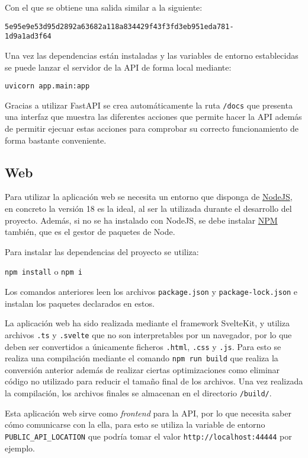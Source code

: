 Con el que se obtiene una salida similar a la siguiente:

\texttt{5e95e9e53d95d2892a63682a118a834429f43f3fd3eb951eda781-}\\
\texttt{1d9a1ad3f64}

Una vez las dependencias están instaladas y las variables de entorno
establecidas se puede lanzar el servidor de la API de forma local mediante:

\texttt{uvicorn app.main:app}

Gracias a utilizar FastAPI se crea automáticamente la ruta \texttt{/docs} que
presenta una interfaz que muestra las diferentes acciones que permite hacer la
API además de permitir ejecuar estas acciones para comprobar su correcto
funcionamiento de forma bastante conveniente.

\subsection{Web}

Para utilizar la aplicación web se necesita un entorno que disponga de
\href{https://nodejs.org/}{NodeJS}, en concreto la versión 18 es la ideal, al
ser la utilizada durante el desarrollo del proyecto. Además, si no se ha
instalado con NodeJS, se debe instalar \href{https://www.npmjs.com/}{NPM}
también, que es el gestor de paquetes de Node.

Para instalar las dependencias del proyecto se utiliza:

\texttt{npm install} o \texttt{npm i}

Los comandos anteriores leen los archivos \texttt{package.json} y \linebreak
\texttt{package-lock.json} e instalan los paquetes declarados en estos.

La aplicación web ha sido realizada mediante el framework SvelteKit, y utiliza
archivos \texttt{.ts} y \texttt{.svelte} que no son interpretables por un
navegador, por lo que deben ser convertidos a únicamente ficheros
\texttt{.html}, \texttt{.css} y \texttt{.js}. Para esto se realiza una
compilación mediante el comando \texttt{npm run build} que realiza la conversión
anterior además de realizar ciertas optimizaciones como eliminar código no
utilizado para reducir el tamaño final de los archivos. Una vez realizada la
compilación, los archivos finales se almacenan en el directorio
\texttt{/build/}.

Esta aplicación web sirve como \textit{frontend} para la API, por lo que
necesita saber cómo comunicarse con la ella, para esto se utiliza la variable de
entorno \texttt{PUBLIC\_API\_LOCATION} que podría tomar el valor
\texttt{http://localhost:44444} por ejemplo.

